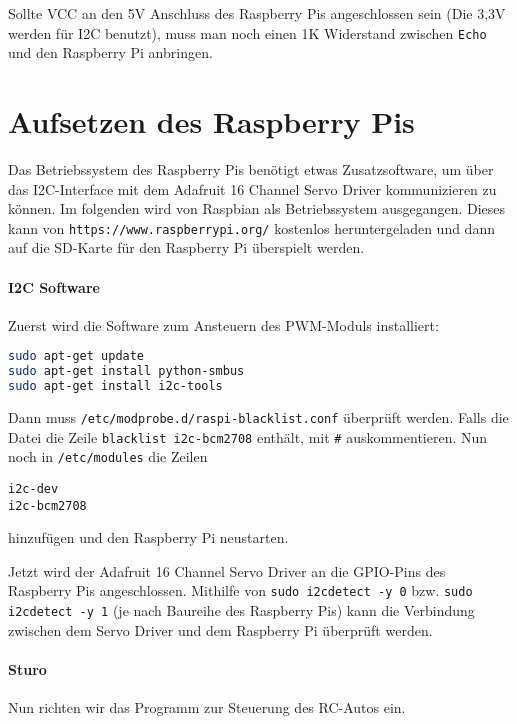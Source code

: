 \documentclass[a4paper,10pt]{scrartcl}
\begin{document}
    Sollte VCC an den 5V Anschluss des Raspberry Pis angeschlossen sein (Die 3,3V werden für I2C
    benutzt), muss man noch einen 1K Widerstand zwischen \lstinline{Echo} und den Raspberry Pi
    anbringen.

\section{Aufsetzen des Raspberry Pis}

  Das Betriebssystem des Raspberry Pis benötigt etwas Zusatzsoftware, um über das I2C-Interface mit
  dem Adafruit 16 Channel Servo Driver kommunizieren zu können.
  Im folgenden wird von Raspbian als Betriebssystem ausgegangen.
  Dieses kann von \lstinline{https://www.raspberrypi.org/} kostenlos heruntergeladen und dann auf
  die SD-Karte für den Raspberry Pi überspielt werden.

  \paragraph{I2C Software} Zuerst wird die Software zum Ansteuern des PWM-Moduls installiert:
    \begin{lstlisting}[language=sh]
sudo apt-get update
sudo apt-get install python-smbus
sudo apt-get install i2c-tools
    \end{lstlisting}

    Dann muss \lstinline{/etc/modprobe.d/raspi-blacklist.conf} überprüft werden.
    Falls die Datei die Zeile \lstinline{blacklist i2c-bcm2708} enthält, mit \lstinline{#}
    auskommentieren.
    Nun noch in \lstinline{/etc/modules} die Zeilen
    \begin{lstlisting}
i2c-dev
i2c-bcm2708
    \end{lstlisting}

    hinzufügen und den Raspberry Pi neustarten.

    Jetzt wird der Adafruit 16 Channel Servo Driver an die GPIO-Pins des Raspberry Pis
    angeschlossen.
    Mithilfe von \lstinline{sudo i2cdetect -y 0} bzw. \lstinline{sudo i2cdetect -y 1} (je nach
    Baureihe des Raspberry Pis) kann die Verbindung zwischen dem Servo Driver und dem Raspberry Pi
    überprüft werden.\cite{adafruitlearn}

  \paragraph{Sturo} Nun richten wir das Programm zur Steuerung des RC-Autos ein.
\end{document}
